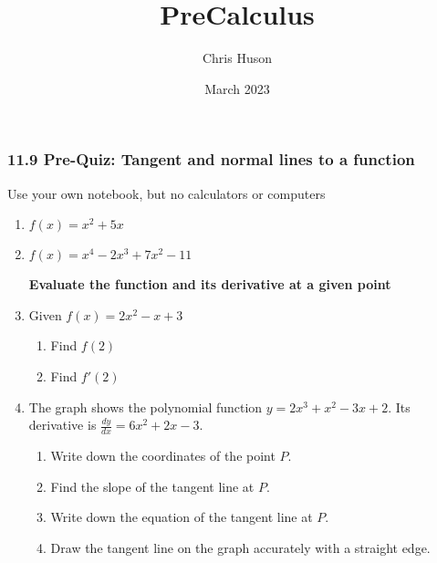 \documentclass[12pt, twoside]{article}
\title{PreCalculus}
\author{Chris Huson}
\date{March 2023}
\begin{document}
\subsubsection*{11.9 Pre-Quiz: Tangent and normal lines to a function}
Use your own notebook, but no calculators or computers

\begin{enumerate}

\subsubsection*{Find the derivative of each polynomial function}
\item $f(x)=x^2+5x$ \vspace{3cm}
\item $f(x)=x^4-2x^3+7x^2-11$ \par \vspace{3cm}

\textbf{Evaluate the function and its derivative at a given point}
\item Given $f(x)=2x^2-x+3$
\begin{enumerate}[itemsep=3cm]
    \item Find $f(2)$
    \item Find $f'(2)$
\end{enumerate} \vspace{2cm}

\newpage
\item The graph shows the polynomial function $\displaystyle y=2x^3+x^2-3x+2$. Its derivative is $\displaystyle \frac{dy}{dx}=6x^2+2x-3$. 
\begin{multicols}{2}
    \begin{enumerate}[itemsep=1cm]
        \item Write down the coordinates of the point $P$.
        \item Find the slope of the tangent line at $P$.
        \item Write down the equation of the tangent line at $P$.
        \item Draw the tangent line on the graph accurately with a straight edge.
    \end{enumerate}
        \begin{center}
    \end{center}
\end{multicols}


\end{enumerate}
\end{document}
